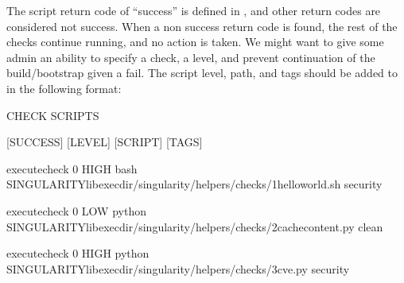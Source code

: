 \documentclass[letterpaper,10pt,english]{sphinxmanual}
\begin{document}
 The script return code of “success” is defined in
, and other return
codes are considered not success. When a non success return code is
found, the rest of the checks continue running, and no action is
taken. We might want to give some admin an ability to specify a check,
a level, and prevent continuation of the build/bootstrap given a fail.
 The script level, path, and tags should be added to
 in the following format:

%
\begin{sphinxVerbatim}[commandchars=\\\{\}]
\PYGZsh{}\PYGZsh{}\PYGZsh{}\PYGZsh{}\PYGZsh{}\PYGZsh{}\PYGZsh{}\PYGZsh{}\PYGZsh{}\PYGZsh{}\PYGZsh{}\PYGZsh{}\PYGZsh{}\PYGZsh{}\PYGZsh{}\PYGZsh{}\PYGZsh{}\PYGZsh{}\PYGZsh{}\PYGZsh{}\PYGZsh{}\PYGZsh{}\PYGZsh{}\PYGZsh{}\PYGZsh{}\PYGZsh{}\PYGZsh{}\PYGZsh{}\PYGZsh{}\PYGZsh{}\PYGZsh{}\PYGZsh{}\PYGZsh{}\PYGZsh{}\PYGZsh{}\PYGZsh{}\PYGZsh{}\PYGZsh{}\PYGZsh{}\PYGZsh{}\PYGZsh{}\PYGZsh{}\PYGZsh{}\PYGZsh{}\PYGZsh{}\PYGZsh{}\PYGZsh{}\PYGZsh{}\PYGZsh{}\PYGZsh{}\PYGZsh{}\PYGZsh{}\PYGZsh{}\PYGZsh{}\PYGZsh{}\PYGZsh{}\PYGZsh{}\PYGZsh{}\PYGZsh{}\PYGZsh{}\PYGZsh{}\PYGZsh{}\PYGZsh{}\PYGZsh{}\PYGZsh{}\PYGZsh{}\PYGZsh{}\PYGZsh{}\PYGZsh{}\PYGZsh{}\PYGZsh{}\PYGZsh{}\PYGZsh{}\PYGZsh{}\PYGZsh{}\PYGZsh{}\PYGZsh{}\PYGZsh{}\PYGZsh{}\PYGZsh{}\PYGZsh{}\PYGZsh{}

\PYGZsh{} CHECK SCRIPTS

\PYGZsh{}\PYGZsh{}\PYGZsh{}\PYGZsh{}\PYGZsh{}\PYGZsh{}\PYGZsh{}\PYGZsh{}\PYGZsh{}\PYGZsh{}\PYGZsh{}\PYGZsh{}\PYGZsh{}\PYGZsh{}\PYGZsh{}\PYGZsh{}\PYGZsh{}\PYGZsh{}\PYGZsh{}\PYGZsh{}\PYGZsh{}\PYGZsh{}\PYGZsh{}\PYGZsh{}\PYGZsh{}\PYGZsh{}\PYGZsh{}\PYGZsh{}\PYGZsh{}\PYGZsh{}\PYGZsh{}\PYGZsh{}\PYGZsh{}\PYGZsh{}\PYGZsh{}\PYGZsh{}\PYGZsh{}\PYGZsh{}\PYGZsh{}\PYGZsh{}\PYGZsh{}\PYGZsh{}\PYGZsh{}\PYGZsh{}\PYGZsh{}\PYGZsh{}\PYGZsh{}\PYGZsh{}\PYGZsh{}\PYGZsh{}\PYGZsh{}\PYGZsh{}\PYGZsh{}\PYGZsh{}\PYGZsh{}\PYGZsh{}\PYGZsh{}\PYGZsh{}\PYGZsh{}\PYGZsh{}\PYGZsh{}\PYGZsh{}\PYGZsh{}\PYGZsh{}\PYGZsh{}\PYGZsh{}\PYGZsh{}\PYGZsh{}\PYGZsh{}\PYGZsh{}\PYGZsh{}\PYGZsh{}\PYGZsh{}\PYGZsh{}\PYGZsh{}\PYGZsh{}\PYGZsh{}\PYGZsh{}\PYGZsh{}\PYGZsh{}\PYGZsh{}\PYGZsh{}


\PYGZsh{}        [SUCCESS] [LEVEL]  [SCRIPT]                                                                         [TAGS]

execute\PYGZus{}check    0    HIGH  \PYGZdq{}bash \PYGZdl{}SINGULARITY\PYGZus{}libexecdir/singularity/helpers/checks/1\PYGZhy{}hello\PYGZhy{}world.sh\PYGZdq{}       security

execute\PYGZus{}check    0     LOW  \PYGZdq{}python \PYGZdl{}SINGULARITY\PYGZus{}libexecdir/singularity/helpers/checks/2\PYGZhy{}cache\PYGZhy{}content.py\PYGZdq{}   clean

execute\PYGZus{}check    0    HIGH  \PYGZdq{}python \PYGZdl{}SINGULARITY\PYGZus{}libexecdir/singularity/helpers/checks/3\PYGZhy{}cve.py\PYGZdq{}             security
\end{sphinxVerbatim}
\end{document}
